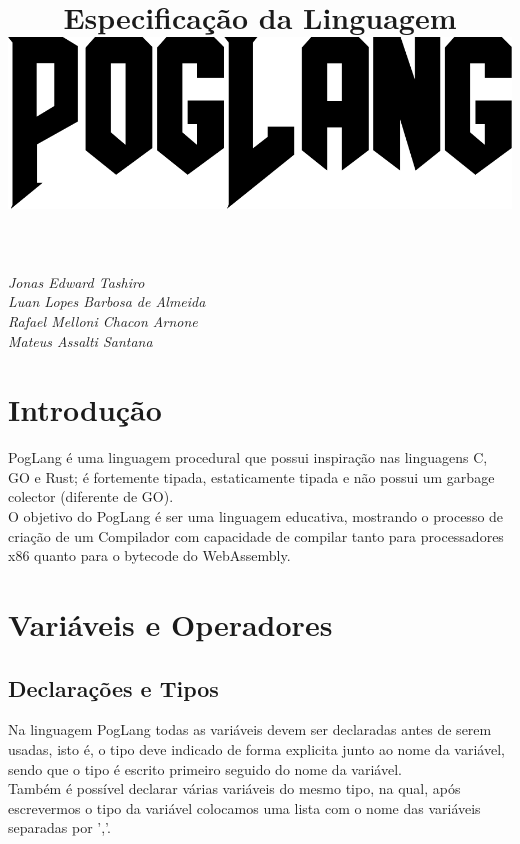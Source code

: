 \documentclass[12pt, letterpaper]{article}
\title{
        \Huge{Especificação da Linguagem \\[10mm]}
        \centering \includegraphics[scale=0.25]{PogLang}
}
\author{}
\date{}
\newcommand\tab[1][1cm]{\hspace*{#1}}
\begin{document}
\maketitle
\textit{
        \centering\LARGE{
                Jonas Edward Tashiro\\ 
                Luan Lopes Barbosa de Almeida\\ 
                Rafael Melloni Chacon Arnone\\ 
                Mateus Assalti Santana\\
        }
}


\newpage
\tableofcontents

\newpage
\section{Introdução}
\tab\large PogLang é uma linguagem procedural que possui inspiração nas linguagens C, GO e Rust; é fortemente
tipada, estaticamente tipada e não possui um garbage colector (diferente de GO).\\[1.0mm]
\tab O objetivo do PogLang é ser uma linguagem educativa, mostrando o processo de criação de um Compilador com 
capacidade de compilar tanto para processadores x86 quanto para o bytecode do WebAssembly.\\[1.0mm]

\section{Variáveis e Operadores}
\subsection{Declarações e Tipos}
\tab Na linguagem PogLang todas as variáveis devem ser declaradas antes de serem usadas, isto é, o tipo 
deve indicado de forma explicita junto ao nome da variável, sendo que o tipo é escrito primeiro seguido 
do nome da variável. \\[1.0mm]
\tab Também é possível declarar várias variáveis do mesmo tipo, na qual, após escrevermos o tipo da variável  
colocamos uma lista com o nome das variáveis separadas por ','. \\[1.0mm]

\begin{spacing}{1.5}
\end{spacing}
\end{document}
